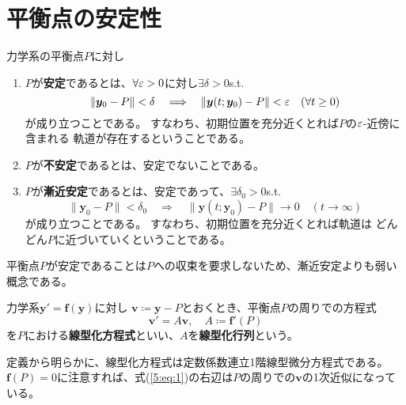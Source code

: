 \documentclass[report]{jlreq}
\begin{document}
\section{平衡点の安定性}

\begin{definition}[5.2.1]
    力学系の平衡点$P$に対し
    \begin{enumerate}
        \item $P$が\textbf{安定}であるとは、$\forall \varepsilon > 0$に対し$\exists \delta > 0$\quad s.t.
            \begin{equation}
                \| \bm{y}_0 - P \| < \delta
                \quad \Longrightarrow \quad
                \| \bm{y}(t; \bm{y}_0) - P \| < \varepsilon \quad (\forall t \ge 0)
            \end{equation}
            が成り立つことである。
            すなわち、初期位置を充分近くとれば$P$の$\varepsilon$-近傍に含まれる
            軌道が存在するということである。
        \item $P$が\textbf{不安定}であるとは、安定でないことである。
        \item $P$が\textbf{漸近安定}であるとは、安定であって、$\exists \delta_0 > 0$\quad s.t.
            \begin{equation}
                \| \bm{y}_0 - P \| < \delta_0
                \quad \Longrightarrow \quad
                \| \bm{y}(t; \bm{y}_0) - P \| \to 0 \quad (t \to \infty)
            \end{equation}
            が成り立つことである。
            すなわち、初期位置を充分近くとれば軌道は
            どんどん$P$に近づいていくということである。
    \end{enumerate}
\end{definition}

平衡点$P$が安定であることは$P$への収束を要求しないため、漸近安定よりも弱い概念である。

\begin{definition}[線型化方程式]
    力学系$\bm{y}' = \bm{f}(\bm{y})$に対し
    $\bm{v} \coloneqq \bm{y} - P$とおくとき、平衡点$P$の周りでの方程式
    \begin{equation}
        \bm{v}' = A \bm{v},\quad
        A \coloneq\bm{f}'(P) 
        \label{5:eq:1}
    \end{equation}
    を$P$における\textbf{線型化方程式}といい、$A$を\textbf{線型化行列}という。
\end{definition}

定義から明らかに、線型化方程式は定数係数連立1階線型微分方程式である。
$\bm{f}(P) = 0$に注意すれば、式(\ref{5:eq:1})の右辺は$P$の周りでの$\bm{v}$の1次近似になっている。
\end{document}
